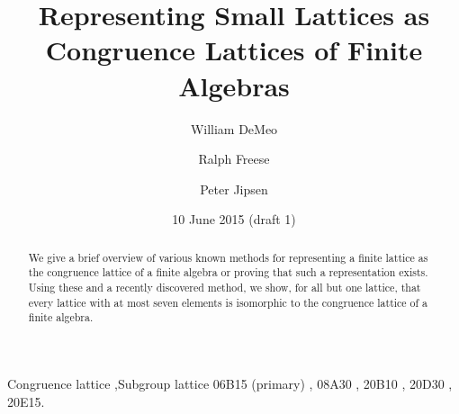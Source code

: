 \author{William DeMeo}
\address{Department of Mathematics, Iowa State University, Ames, IA 50010}
\author{Ralph Freese}
\address{Department of Mathematics, University of Hawaii, Honolulu, HI 96822}
\author{Peter Jipsen}
\address{Department of Mathematics, Chapman University, Orange, CA 92866}

\title{Representing Small Lattices as \\Congruence Lattices of Finite Algebras}

\date{10 June 2015 (draft 1)}
\begin{abstract}
  We give a brief overview of various known methods for
  representing a finite lattice as the congruence lattice of a finite algebra or
  proving that such a representation exists.
  Using these and a recently discovered method, we show, for all but one lattice,
  that every lattice with at most seven elements is isomorphic to the congruence
  lattice of a finite algebra.  
\end{abstract}

\begin{keyword}
  Congruence lattice \sep Subgroup lattice
  \MSC[2010] 
  06B15 (primary) \sep %
  08A30 \sep    %
  20B10 \sep %
  20D30 \sep %
  20E15. %
\end{keyword}
